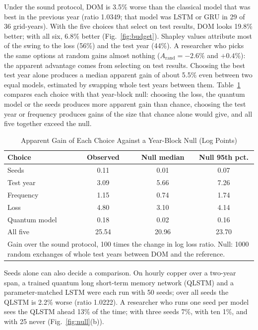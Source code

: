 \documentclass{ieeeaccess}
\begin{document}
Under the sound protocol, DOM is 3.5\% worse than the classical model that was best in the previous year (ratio 1.0349; that model was LSTM or GRU in 29 of 36 grid-years). With the five choices that select on test results, DOM looks 19.8\% better; with all six, 6.8\% better (Fig.~\ref{fig:budget}). Shapley values \cite{shapley1953} attribute most of the swing to the loss (56\%) and the test year (44\%). A researcher who picks the same options at random gains almost nothing ($A_{\mathrm{rand}}=-2.6\%$ and $+0.4\%$): the apparent advantage comes from selecting on test results. Choosing the best test year alone produces a median apparent gain of about 5.5\% even between two equal models, estimated by swapping whole test years between them. Table~\ref{tab:null} compares each choice with that year-block null: choosing the loss, the quantum model or the seeds produces more apparent gain than chance, choosing the test year or frequency produces gains of the size that chance alone would give, and all five together exceed the null.

\begin{table}[t]
\caption{Apparent Gain of Each Choice Against a Year-Block Null (Log Points)}
\label{tab:null}
\centering
\begin{tabular}{lccc}
\hline
Choice & Observed & Null median & Null 95th pct. \\
\hline
Seeds & 0.11 & 0.01 & 0.07 \\
Test year & 3.09 & 5.66 & 7.26 \\
Frequency & 1.15 & 0.74 & 1.74 \\
Loss & 4.80 & 3.10 & 4.14 \\
Quantum model & 0.18 & 0.02 & 0.16 \\
All five & 25.54 & 20.96 & 23.70 \\
\hline
\multicolumn{4}{p{7.6cm}}{\footnotesize Gain over the sound protocol, 100 times the change in log loss ratio. Null: 1000 random exchanges of whole test years between DOM and the reference.}\\
\end{tabular}
\end{table}

Seeds alone can also decide a comparison. On hourly copper over a two-year span, a trained quantum long short-term memory network (QLSTM) \cite{chen2020} and a parameter-matched LSTM were each run with 50 seeds; over all seeds the QLSTM is 2.2\% worse (ratio 1.0222). A researcher who runs one seed per model sees the QLSTM ahead 13\% of the time; with three seeds 7\%, with ten 1\%, and with 25 never (Fig.~\ref{fig:null}(b)).
\end{document}

